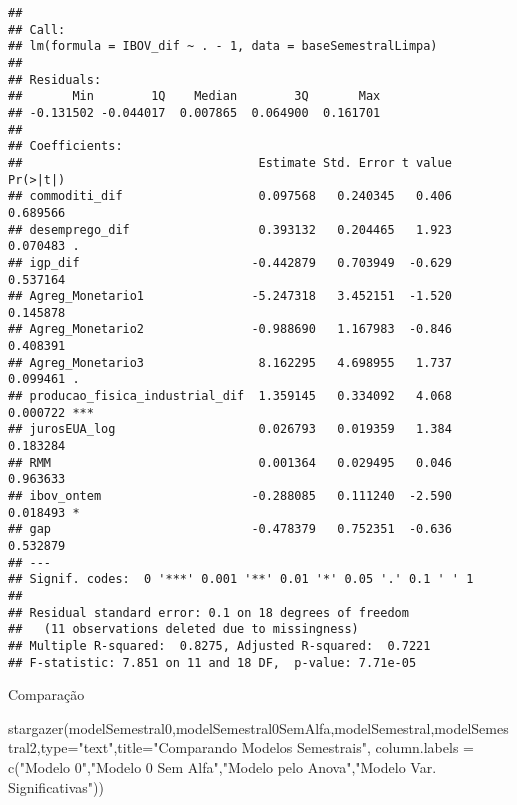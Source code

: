 \documentclass[
]{article}
\newenvironment{Shaded}{\begin{snugshade}}{\end{snugshade}}
\newcommand{\AttributeTok}[1]{\textcolor[rgb]{0.77,0.63,0.00}{#1}}
\newcommand{\FunctionTok}[1]{\textcolor[rgb]{0.00,0.00,0.00}{#1}}
\newcommand{\NormalTok}[1]{#1}
\newcommand{\StringTok}[1]{\textcolor[rgb]{0.31,0.60,0.02}{#1}}
\begin{document}
\begin{verbatim}
## 
## Call:
## lm(formula = IBOV_dif ~ . - 1, data = baseSemestralLimpa)
## 
## Residuals:
##       Min        1Q    Median        3Q       Max 
## -0.131502 -0.044017  0.007865  0.064900  0.161701 
## 
## Coefficients:
##                                 Estimate Std. Error t value Pr(>|t|)    
## commoditi_dif                   0.097568   0.240345   0.406 0.689566    
## desemprego_dif                  0.393132   0.204465   1.923 0.070483 .  
## igp_dif                        -0.442879   0.703949  -0.629 0.537164    
## Agreg_Monetario1               -5.247318   3.452151  -1.520 0.145878    
## Agreg_Monetario2               -0.988690   1.167983  -0.846 0.408391    
## Agreg_Monetario3                8.162295   4.698955   1.737 0.099461 .  
## producao_fisica_industrial_dif  1.359145   0.334092   4.068 0.000722 ***
## jurosEUA_log                    0.026793   0.019359   1.384 0.183284    
## RMM                             0.001364   0.029495   0.046 0.963633    
## ibov_ontem                     -0.288085   0.111240  -2.590 0.018493 *  
## gap                            -0.478379   0.752351  -0.636 0.532879    
## ---
## Signif. codes:  0 '***' 0.001 '**' 0.01 '*' 0.05 '.' 0.1 ' ' 1
## 
## Residual standard error: 0.1 on 18 degrees of freedom
##   (11 observations deleted due to missingness)
## Multiple R-squared:  0.8275, Adjusted R-squared:  0.7221 
## F-statistic: 7.851 on 11 and 18 DF,  p-value: 7.71e-05
\end{verbatim}

Comparação

\begin{Shaded}
\begin{Highlighting}[]
\FunctionTok{stargazer}\NormalTok{(modelSemestral0,modelSemestral0SemAlfa,modelSemestral,modelSemestral2,}\AttributeTok{type=}\StringTok{"text"}\NormalTok{,}\AttributeTok{title=}\StringTok{"Comparando Modelos Semestrais"}\NormalTok{,}
                                 \AttributeTok{column.labels =} \FunctionTok{c}\NormalTok{(}\StringTok{"Modelo 0"}\NormalTok{,}\StringTok{"Modelo 0 Sem Alfa"}\NormalTok{,}\StringTok{"Modelo pelo Anova"}\NormalTok{,}\StringTok{"Modelo Var. Significativas"}\NormalTok{))}
\end{Highlighting}
\end{Shaded}
\end{document}
